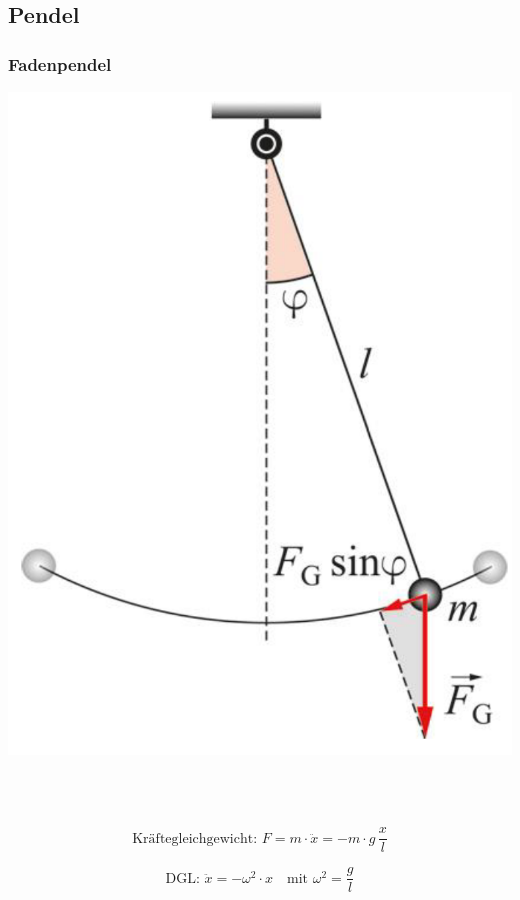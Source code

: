 \subsection{Pendel}

\subsubsection{Fadenpendel}

\begin{minipage}{0.3\linewidth}
\includegraphics[width=0.9\linewidth]{Bilder/Wellen-Optik/fadenpendel}
\end{minipage}
\hfill
\begin{minipage}{0.66\linewidth}

 \\

 \\


$$ \text{Kräftegleichgewicht: } F = m \cdot \ddot{x} = - m \cdot g \, \frac{x}{l} $$


$$ \boxed{ \text{DGL: } \ddot{x} = - \omega^2 \cdot x \quad \text{mit } \omega^2 = \frac{g}{l}  }$$

\end{minipage}




